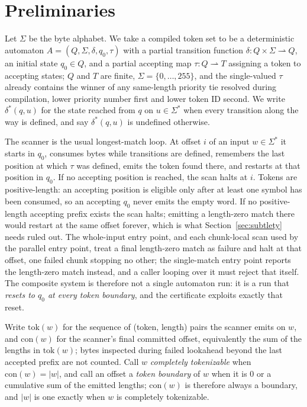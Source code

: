 \documentclass[11pt,a4paper]{article}
\theoremstyle{definition}
\theoremstyle{plain}
\begin{document}
\section{Preliminaries}
\label{sec:prelim}

Let $\Sigma$ be the byte alphabet. We take a compiled token set to be a deterministic automaton $A = (Q, \Sigma,
\delta, q_0, \tau)$ with a partial transition function $\delta : Q \times \Sigma \rightharpoonup Q$, an initial state
$q_0 \in Q$, and a partial accepting map $\tau : Q \rightharpoonup T$ assigning a token to accepting states; $Q$ and
$T$ are finite, $\Sigma = \{0, \ldots, 255\}$, and the single-valued $\tau$ already contains the winner of any
same-length priority tie resolved during compilation, lower priority number first and lower token ID second. We write
$\delta^*(q, u)$ for the state reached from $q$ on $u \in \Sigma^*$ when every transition along the way is defined,
and say $\delta^*(q,u)$ is undefined otherwise.

The scanner is the usual longest-match loop. At offset $i$ of an input $w \in \Sigma^*$ it starts in $q_0$, consumes
bytes while transitions are defined, remembers the last position at which $\tau$ was defined, emits the token found
there, and restarts at that position in $q_0$. If no accepting position is reached, the scan halts at $i$. Tokens are
positive-length: an accepting position is eligible only after at least one symbol has been consumed, so an accepting
$q_0$ never emits the empty word. If no positive-length accepting prefix exists the scan halts; emitting a length-zero
match there would restart at the same offset forever, which is what Section~\ref{sec:subtlety} needs ruled out. The
whole-input entry point, and each chunk-local scan used by the parallel entry point, treat a final length-zero match
as failure and halt at that offset, one failed chunk stopping no other; the single-match entry point reports the
length-zero match instead, and a caller looping over it must reject that itself. The composite system is therefore not
a single automaton run: it is a run that \emph{resets to $q_0$ at every token boundary}, and the certificate exploits
exactly that reset.

Write $\mathrm{tok}(w)$ for the sequence of (token, length) pairs the scanner emits on $w$, and $\mathrm{con}(w)$ for
the scanner's final committed offset, equivalently the sum of the lengths in $\mathrm{tok}(w)$; bytes inspected during
failed lookahead beyond the last accepted prefix are not counted. Call $w$ \emph{completely tokenizable} when
$\mathrm{con}(w) = |w|$, and call an offset a \emph{token boundary} of $w$ when it is $0$ or a cumulative sum of the
emitted lengths; $\mathrm{con}(w)$ is therefore always a boundary, and $|w|$ is one exactly when $w$ is completely
tokenizable.
\end{document}
